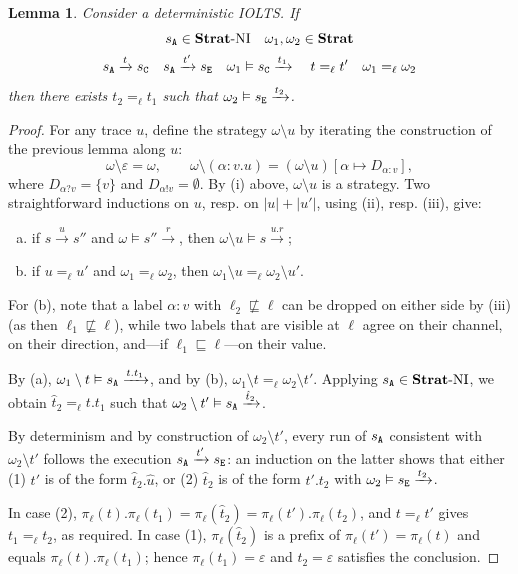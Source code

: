 \documentclass[preprint,5p,twocolumn]{elsarticle}
\newtheorem{lemma}[theorem]{Lemma}
\begin{document}
\begin{lemma}
  \label{thm:indistinguishable NI}
  Consider a deterministic IOLTS. If
    \begin{gather*}
    s_{\mathtt{A}} \in \mathbf{Strat}\text{-}\mathrm{NI} \quad
    \omega_1,\omega_2 \in \mathbf{Strat}\\
    s_{\mathtt{A}} \xrightarrow{t} s_{\mathtt{C}} \quad
    s_{\mathtt{A}} \xrightarrow{t'} s_{\mathtt{E}}\quad
    \omega_1 \vDash s_{\mathtt{C}} \xrightarrow{t_1} \quad
    t =_\ell t'\quad
    \omega_1 =_\ell \omega_2
  \end{gather*}
  then there exists $t_2 =_\ell t_1$ such that $\omega_2 \vDash s_{\mathtt{E}} \xrightarrow{t_2}$.
\end{lemma}
\begin{proof}
  For any trace $u$, define the strategy $\omega \setminus u$ by iterating the construction of the
  previous lemma along $u$:
  $$\omega \setminus \varepsilon = \omega, \qquad
  \omega \setminus (\alpha : v.u) = (\omega \setminus u)[\alpha \mapsto D_{\alpha:v}],$$
  where $D_{\alpha ? v} = \{v\}$ and $D_{\alpha ! v} = \emptyset$. By (i) above, $\omega\setminus u$
  is a strategy. Two straightforward inductions on $u$, resp. on $|u| + |u'|$, using (ii), resp. (iii),
  give:
  \begin{enumerate}[(a)]
  \item if $s \xrightarrow{u} s''$ and $\omega \vDash s'' \xrightarrow{r}$, then
    $\omega \setminus u \vDash s \xrightarrow{u.r}$;
  \item if $u =_\ell u'$ and $\omega_1 =_\ell \omega_2$, then
    $\omega_1 \setminus u =_\ell \omega_2 \setminus u'$.
  \end{enumerate}
  For (b), note that a label $\alpha : v$ with $\ell_2 \not\sqsubseteq \ell$ can be dropped on either
  side by (iii) (as then $\ell_1 \not \sqsubseteq \ell$), while two labels that are visible at $\ell$
  agree on their channel, on their direction, and---if $\ell_1 \sqsubseteq \ell$---on their value.

  By (a), $\omega_1 \setminus t \vDash s_{\mathtt{A}} \xrightarrow{t.t_1}$, and by (b),
  $\omega_1 \setminus t =_\ell \omega_2 \setminus t'$. Applying $s_{\mathtt{A}} \in \mathbf{Strat}\text{-}\mathrm{NI}$, we obtain
  $\hat{t}_2 =_\ell t.t_1$ such that $\omega_2 \setminus t' \vDash s_{\mathtt{A}} \xrightarrow{\hat{t}_2}$.

  By determinism and by construction of $\omega_2 \setminus t'$, every run of $s_{\mathtt{A}}$ consistent with
  $\omega_2 \setminus t'$ follows the execution $s_{\mathtt{A}} \xrightarrow{t'} s_{\mathtt{E}}$: an induction on the latter
  shows that either (1) $t'$ is of the form $\hat{t}_2.\hat{u}$, or (2) $\hat{t}_2$ is of the form
  $t'.t_2$ with $\omega_2 \vDash s_{\mathtt{E}} \xrightarrow{t_2}$.

  In case (2), $\pi_\ell(t).\pi_\ell(t_1) = \pi_\ell(\hat{t}_2) = \pi_\ell(t').\pi_\ell(t_2)$, and
  $t =_\ell t'$ gives $t_1 =_\ell t_2$, as required. In case (1), $\pi_\ell(\hat{t}_2)$ is a prefix of
  $\pi_\ell(t') = \pi_\ell(t)$ and equals $\pi_\ell(t).\pi_\ell(t_1)$; hence
  $\pi_\ell(t_1) = \varepsilon$ and $t_2 = \varepsilon$ satisfies the conclusion.
\end{proof}
\end{document}
